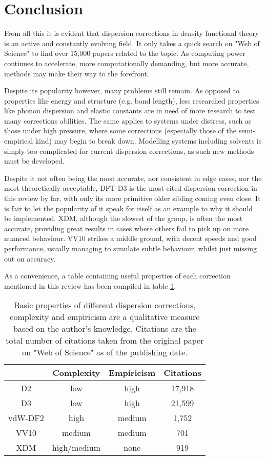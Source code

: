 \documentclass[10pt,a4paper,twocolumn,twoside]{extarticle}
\begin{document}
	\newpage
	\section{Conclusion}
	From all this it is evident that dispersion corrections in density functional theory is an active and constantly evolving field. It only takes a quick search on "Web of Science" to find over 15,000 papers related to the topic. As computing power continues to accelerate, more computationally demanding, but more accurate, methods may make their way to the forefront.

	Despite its popularity however, many problems still remain. As opposed to properties like energy and structure (e.g. bond length), less researched properties like phonon dispersion and elastic constants are in need of more research to test many corrections abilities. The same applies to systems under distress, such as those under high pressure, where some corrections (especially those of the semi-empirical kind) may begin to break down. Modelling systems including solvents is simply too complicated for current dispersion corrections, as such new methods must be developed. 

	Despite it not often being the most accurate, nor consistent in edge cases, nor the most theoretically acceptable, DFT-D3 is the most cited dispersion correction in this review by far, with only its more primitive older sibling coming even close. It is fair to let the popularity of it speak for itself as an example to why it should be implemented. XDM, although the slowest of the group, is often the most accurate, providing great results in cases where others fail to pick up on more nuanced behaviour. VV10 strikes a middle ground, with decent speeds and good performance, usually managing to simulate subtle behaviour, whilst just missing out on accuracy. 

	As a convenience, a table containing useful properties of each correction mentioned in this review has been compiled in table \ref{tab:conc}. 

	\begin{table}
		\begin{tabular}{c|c c c}
			& Complexity & Empiricism & Citations \\
			\hline
			D2 & low & high & 17,918\\
			D3 & low & high & 21,599\\
			vdW-DF2 & high & medium  & 1,752\\
			VV10 & medium & medium & 701\\
			XDM & high/medium & none & 919\\
		\end{tabular}
		\caption{Basic properties of different dispersion corrections, complexity and empiricism are a qualitative measure based on the author's knowledge. Citations are the total number of citations taken from the original paper on "Web of Science" as of the publishing date.}
		\label{tab:conc}
	\end{table}


	\newpage
	\printbibliography
	
\end{document}
